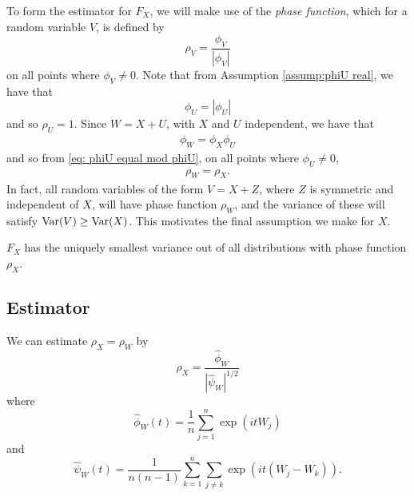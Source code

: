 	To form the estimator for $F_X$, we will make use of the \emph{phase function}, which for a random variable $V$, is defined by
	\begin{equation}
		\rho_V = \frac{\phi_V}{|\phi_V|}
	\end{equation}
	on all points where $\phi_V \neq 0$.
	Note that from Assumption \ref{assump:phiU real}, we have that 
	\begin{equation}
	\label{eq: phiU equal mod phiU}
		\phi_U = |\phi_U|
	\end{equation}
	and so $\rho_U = 1$.
	Since $W = X+U$, with $X$ and $U$ independent, we have that
	\begin{align}
		\phi_W = \phi_X \phi_U
	\end{align}
	and so from \eqref{eq: phiU equal mod phiU}, on all points where $\phi_U \neq 0$,
	\begin{align}
		\rho_W = \rho_X.
	\end{align}
	In fact, all random variables of the form $V = X + Z$, where $Z$ is symmetric and independent of $X$, will have phase function $\rho_W$, and the variance of these will satisfy $\mathrm{Var}(V) \geq \mathrm{Var}(X)$. This motivates the final assumption we make for $X$.

	\begin{assumption}
	\label{assump:X has smallest variance}
		$F_X$ has the uniquely smallest variance out of all distributions with phase function $\rho_X$.
	\end{assumption}

	\subsection{Estimator}
	We can estimate $\rho_X = \rho_W$ by
	\begin{equation}
		\hat{\rho}_X = \frac{\hat{\phi}_W}{\left|\hat{\psi}_W\right|^{1/2}}
	\end{equation}
	where
	\begin{equation}
	\label{eq:define hat phi W}
		\hat{\phi}_W(t) = \frac{1}{n}\sum_{j = 1}^n \exp(it W_j)
	\end{equation}
	and 
	\begin{equation}
	\label{eq:define hat psi W}
		\hat{\psi}_W(t) = \frac{1}{n(n-1)} \sum_{k=1}^n \sum_{j \neq k} \exp(it (W_j - W_k)).
	\end{equation}

